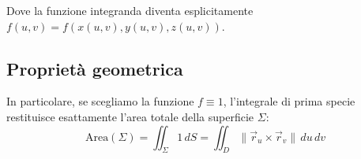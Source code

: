 Dove la funzione integranda diventa esplicitamente $f(u,v) = f(x(u,v), y(u,v), z(u,v))$.

\subsection{Proprietà geometrica}
In particolare, se scegliamo la funzione $f \equiv 1$, l'integrale di prima specie restituisce esattamente l'area totale della superficie $\Sigma$:
$$ \text{Area}(\Sigma) = \iint_{\Sigma} 1 \, dS = \iint_{D} \| \vec{r}_u \times \vec{r}_v \| \, du \, dv $$


